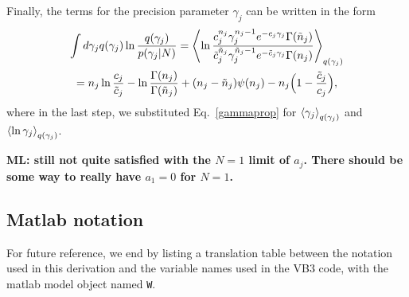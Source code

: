 Finally, the terms for the precision parameter $\gamma_j$ can be
written in the form
\begin{multline}
\int d\gamma_j q(\gamma_j)\ln\frac{q(\gamma_j)}{p(\gamma_j|N)}
=\left\langle \ln\frac{c_j^{n_j}\gamma_j^{n_j-1}e^{-c_j\gamma_j}\Gamma(\tilde n_j)}
      {\tilde c_j^{\tilde n_j}\gamma_j^{\tilde n_j-1}e^{-\tilde c_j\gamma_j}\Gamma(n_j)}\right\rangle_{q(\gamma_j)}\\
=n_j\ln\frac{c_j}{\tilde c_j}                    
-\ln\frac{\Gamma(n_j)}{\Gamma(\tilde n_j)}
+(n_j-\tilde n_j)\psi(n_j)
-n_j\Big(1-\frac{\tilde c_j}{c_j}\Big),
\end{multline}
where in the last step, we substituted Eq.~\eqref{gammaprop} for
$\left\langle \gamma_j\right\rangle_{q(\gamma_j)}$ and
$\left\langle \ln\gamma_j\right\rangle_{q(\gamma_j)}$.

{\bf ML: still not quite satisfied with the $N=1$ limit of
$a_j$. There should be some way to really have $a_1=0$ for $N=1$.}

\subsection{Matlab notation}
\label{Sec:matlabNotation}
For future reference, we end by listing a translation table between
the notation used in this derivation and the variable names used in
the VB3 code, with the matlab model object named \texttt{W}.

